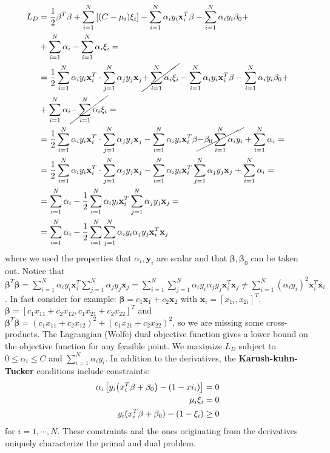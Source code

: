 \documentclass[12pt, letterpaper]{article}
\theoremstyle{definition}
\newcommand{\y}{\mathbf{y}}
\newcommand{\be}{\mathbf{\beta}}
\newcommand{\x}{\mathbf{x}}
\DeclarePairedDelimiter\autobracket{(}{)}
\newcommand{\br}[1]{\autobracket*{#1}}
\begin{document}
\begin{equation}
\begin{aligned}
L_D &= \frac{1}{2}\be^T\be + \sum_{i=1}^N \left[\br{C-\mu_i} \xi_i \right]- \sum_{i=1}^N \alpha_i y_i \x_i^T\beta- \sum_{i=1}^N \alpha_i y_i\beta_0+\\
&+ \sum_{i=1}^N \alpha_i-\sum_{i=1}^N \alpha_i\xi_i = \\
&=\frac{1}{2}\sum_{i=1}^N  \alpha_i y_i \x_i^T\cdot \sum_{j=1}^N  \alpha_j y_j \x_j \cancel{+ \sum_{i=1}^N \alpha_i \xi_i}- \sum_{i=1}^N \alpha_i y_i \x_i^T\beta- \sum_{i=1}^N \alpha_i y_i\beta_0+\\
&+ \sum_{i=1}^N \alpha_i\cancel{-\sum_{i=1}^N \alpha_i\xi_i} =\\
&=\frac{1}{2}\sum_{i=1}^N  \alpha_i y_i \x_i^T\cdot \sum_{j=1}^N  \alpha_j y_j \x_j- \sum_{i=1}^N \alpha_i y_i \x_i^T\beta \cancel{- \beta_0\sum_{i=1}^N \alpha_i y_i}+ \sum_{i=1}^N \alpha_i =\\
&=\frac{1}{2}\sum_{i=1}^N  \alpha_i y_i \x_i^T\cdot \sum_{j=1}^N  \alpha_j y_j \x_j- \sum_{i=1}^N \alpha_i y_i \x_i^T\sum_{j=1}^N \alpha_j y_j \x_j+ \sum_{i=1}^N \alpha_i =\\
&= \sum_{i=1}^N \alpha_i - \frac{1}{2}\sum_{i=1}^N \alpha_i y_i \x_i^T\sum_{j=1}^N \alpha_j y_j \x_j = \\
&= \sum_{i=1}^N \alpha_i - \frac{1}{2}\sum_{i=1}^N\sum_{j=1}^N \alpha_i y_i \alpha_j y_j\x_i^T  \x_j
\end{aligned}
\label{LagrangeDueal}
\end{equation}
where we used the properties that $\alpha_i, \y_i$ are scalar and that $\be, \be_0$ can be taken out. Notice that $\be^T\be  = \sum_{i=1}^N \alpha_i y_i \x_i^T\sum_{j=1}^N\alpha_j y_j \x_j =\sum_{i=1}^N \sum_{j=1}^N \alpha_i y_i \alpha_j y_j  \x_i^T\x_j \ne \sum_{i=1}^N  (\alpha_i y_i)^2 \x_i^T\x_i$. In fact consider for example: $\be = c_1\x_1 + c_2\x_2$ with $\x_i = \left[x_{1i}, x_{2i}\right]^T$. $\be = \left[ c_1x_{11}+c_2x_{12}, c_1x_{21}+c_2x_{22} \right]^T$ and $\be^T\be = (c_1x_{11}+c_2x_{12})^2+(c_1x_{21}+c_2x_{22})^2$, so we are missing some cross-products. The Lagrangian (Wolfe) dual objective function gives a lower bound on the objective function for any feasible point. We maximize $L_D$ subject to $0\le \alpha_i\le C$ and $\sum_{i=1}^N\alpha_iy_i$. In addition to the derivatives, the \textbf{Karush-kuhn-Tucker} conditions include constraints:
\begin{equation}
\begin{aligned}
\alpha_i \left[ y_i\br{x_i^T\be+\be_0}-\br{1-xi_i}\right] &=0\\
\mu_i \xi_i &= 0\\
y_i(x_i^T\be+\be_0) - (1 - \xi_i) &\ge 0
\end{aligned}
\label{KKT}
\end{equation}
for $i=1,\cdots, N$. These constraints and the ones originating from the derivatives uniquely characterize the primal and dual problem.
\end{document}
